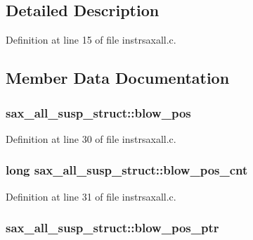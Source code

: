 \subsection{Detailed Description}


Definition at line 15 of file instrsaxall.\+c.



\subsection{Member Data Documentation}
\subsubsection[{\texorpdfstring{blow\+\_\+pos}{blow_pos}}]{ sax\+\_\+all\+\_\+susp\+\_\+struct\+::blow\+\_\+pos}\hypertarget{structsax__all__susp__struct_a43e48b71aecfb3d2c29da7ee0079f41b}{}\label{structsax__all__susp__struct_a43e48b71aecfb3d2c29da7ee0079f41b}


Definition at line 30 of file instrsaxall.\+c.

\subsubsection[{\texorpdfstring{blow\+\_\+pos\+\_\+cnt}{blow_pos_cnt}}]{\setlength{\rightskip}{0pt plus 5cm}long sax\+\_\+all\+\_\+susp\+\_\+struct\+::blow\+\_\+pos\+\_\+cnt}\hypertarget{structsax__all__susp__struct_ac482b1d2e8c110eaf9712c5421832bb0}{}\label{structsax__all__susp__struct_ac482b1d2e8c110eaf9712c5421832bb0}


Definition at line 31 of file instrsaxall.\+c.

\subsubsection[{\texorpdfstring{blow\+\_\+pos\+\_\+ptr}{blow_pos_ptr}}]{ sax\+\_\+all\+\_\+susp\+\_\+struct\+::blow\+\_\+pos\+\_\+ptr}\hypertarget{structsax__all__susp__struct_a01fa81e3e68d63eb98859deb8384995b}{}\label{structsax__all__susp__struct_a01fa81e3e68d63eb98859deb8384995b}


